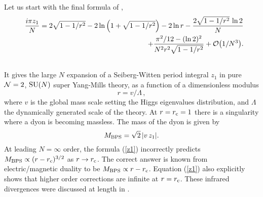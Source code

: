 \documentclass[a4paper,12pt]{article}
\def\suN{{\rm SU}(N)}
\def\rc{r_{\rm c}}\def\gc{g_{\rm c}}
\begin{document}
Let us start with the final formula of \cite{fer},
%
\begin{eqnarray}
\label{z1}
&&\hskip -1.75cm {i\pi z_1\over N} = 2\sqrt{1-1/r^{2}} - 2 \ln\left( 
1+\sqrt{1-1/r^{2}}\right) - 2\ln r - {2\sqrt{1-1/r^{2}}\,\ln 2\over N}
\nonumber\\
&&\hskip 6cm +{\pi^{2}/12 - (\ln 2)^{2}\over 
N^{2}r^{2}\sqrt{1-1/r^{2}}} +
{\cal O}\bigl(1/N^{3}\bigr).\\\nonumber
\end{eqnarray}
%
It gives the large $N$ expansion of a Seiberg-Witten period integral
$z_1$ in pure ${\cal N}=2$, $\suN$ super Yang-Mills theory, as a function
of a dimensionless modulus 
%
\begin{equation}
\label{rdef}
r = v/\Lambda\, ,
\end{equation}
%
where $v$ is the global mass scale
setting the Higgs eigenvalues distribution, and $\Lambda$
the dynamically generated scale of the theory. At $r=\rc=1$ there is a
singularity where a dyon is becoming massless. The mass of the dyon is
given by
%
\begin{equation}
\label{MBPS}
M_{\rm BPS} = \sqrt{2}\, | v\, z_1|.
\end{equation}
%
At leading $N=\infty$ order, the formula (\ref{z1}) incorrectly predicts 
$M_{\rm BPS}\propto (r-\rc)^{3/2}$ as $r\rightarrow\rc$.
The correct answer is known from electric/magnetic
duality \cite{SW} to be $M_{\rm BPS}\propto r-\rc$. Equation (\ref{z1}) 
also explicitly shows that higher order corrections are infinite at $r=\rc$. 
These infrared divergences were discussed at length in \cite{fer}.
\end{document}

